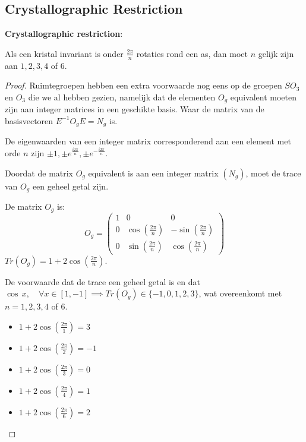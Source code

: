 \subsection{Crystallographic Restriction}
\begin{theorem}
    \textbf{Crystallographic restriction}:

    Als een kristal invariant is onder \(\frac{2\pi }{n}\) rotaties rond een as, dan moet \(n\) gelijk zijn aan \(1, 2, 3, 4\) of \(6\).
    
\end{theorem}


\begin{proof}
   
    Ruimtegroepen hebben een extra voorwaarde nog eens op de groepen \(SO_3\) en \(O_3\) die we al hebben gezien,
    namelijk dat de elementen \(O_g\) equivalent moeten zijn aan integer matrices in een geschikte basis.
    Waar de matrix van de basisvectoren \(E^{-1}O_gE = N_g\) is.
     

    De eigenwaarden van een integer matrix corresponderend aan een element met orde \(n\) zijn \(\pm 1, \pm e^{\frac{i2\pi}{n}}, \pm e^{-\frac{i2\pi}{n}} \).
    
    Doordat de matrix \(O_g\) equivalent is aan een integer matrix \((N_g)\), moet de trace van \(O_g\) een geheel getal zijn.
    
    De matrix \(O_g\) is:
    \[
        O_g = \begin{pmatrix}
            1 & 0 & 0 \\
            0 & \cos(\frac{2\pi}{n}) & -\sin(\frac{2\pi}{n}) \\
            0 & \sin(\frac{2\pi}{n}) & \cos(\frac{2\pi}{n})
        \end{pmatrix}
    \]
    \(Tr (O_g) = 1 + 2\cos(\frac{2\pi}{n})\).

    De voorwaarde dat de trace een geheel getal is en dat \(\cos \,x , \quad\forall x \in [1,-1] \implies Tr(O_g) \in \{-1,0,1,2,3\} \),
    wat overeenkomt met \(n = 1, 2, 3, 4\) of \(6\).
    \begin{itemize}
        \item[\(n = 1\):] \(1 + 2\cos(\frac{2\pi}{1}) = 3\)
        \item[\(n = 2\):] \(1 + 2\cos(\frac{2\pi}{2}) = -1\)
        \item[\(n = 3\):] \(1 + 2\cos(\frac{2\pi}{3}) = 0\)
        \item[\(n = 4\):] \(1 + 2\cos(\frac{2\pi}{4}) = 1\)
        \item[\(n = 6\):] \(1 + 2\cos(\frac{2\pi}{6}) = 2\)
    \end{itemize}
\end{proof}